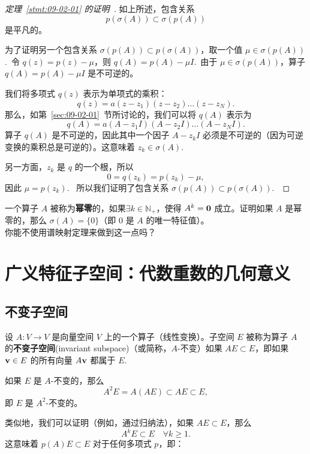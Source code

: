 \begin{proof}[\normalfont\heiti 定理~\ref{stmt:09-02-01} 的证明~\nopunct]
如上所述，包含关系
$$p(\sigma(A)) \subset \sigma(p(A))$$
是平凡的。

为了证明另一个包含关系 $\sigma(p(A)) \subset p(\sigma(A))$，取一个值 $\mu \in \sigma(p(A))$.~令 $q(z) = p(z) - \mu$，则 $q(A) = p(A) - \mu I$.~由于 $\mu \in \sigma(p(A))$，算子 $q(A) = p(A) - \mu I$ 是不可逆的。

我们将多项式 $q(z)$ 表示为单项式的乘积：
$$q(z) = a(z - z_1)(z - z_2) \dots (z - z_N).$$
那么，如第~\ref{sec:09-02-01}~节所讨论的，我们可以将 $q(A)$ 表示为
$$q(A) = a(A - z_1 I)(A - z_2 I) \dots (A - z_N I).$$
算子 $q(A)$ 是不可逆的，因此其中一个因子 $A - z_k I$ 必须是不可逆的（因为可逆变换的乘积总是可逆的）。这意味着 $z_k \in \sigma(A)$.~

另一方面，$z_k$ 是 $q$ 的一个根，所以
$$0 = q(z_k) = p(z_k) - \mu,$$
因此 $\mu = p(z_k)$.~
所以我们证明了包含关系 $\sigma(p(A)) \subset p(\sigma(A))$.~\end{proof}

\begin{problemset}
\item \label{ex:09-02-01} 一个算子 $A$ 被称为\textbf{幂零}的，如果$\exists k \in \mathbb{N}_+$，使得  $A^k = \mathbf{0}$ 成立。证明如果 $A$ 是幂零的，那么 $\sigma(A) = \{0\}$（即 $0$ 是 $A$ 的唯一特征值）。
\\
你能不使用谱映射定理来做到这一点吗？
\end{problemset}

\section{广义特征子空间：代数重数的几何意义}\label{sec:09-03}

\subsection{不变子空间}\label{sec:09-03-01}

\begin{definition*}
设 $A: V \to V$ 是向量空间 $V$ 上的一个算子（线性变换）。子空间 $E$ 被称为算子 $A$ 的\textbf{不变子空间}(invariant subspace)（或简称，$A$-不变）如果 $AE \subset E$，即如果 $\mathbf{v} \in E$ 的所有向量 $A\mathbf{v}$ 都属于 $E$.~
\end{definition*}

如果 $E$ 是 $A$-不变的，那么
$$A^2 E = A(AE) \subset AE \subset E,$$
即 $E$ 是 $A^2$-不变的。

类似地，我们可以证明（例如，通过归纳法），如果 $AE \subset E$，那么 $$A^k E \subset E \quad \forall k \geq 1.$$
这意味着 $p(A)E \subset E$ 对于任何多项式 $p$，即：

